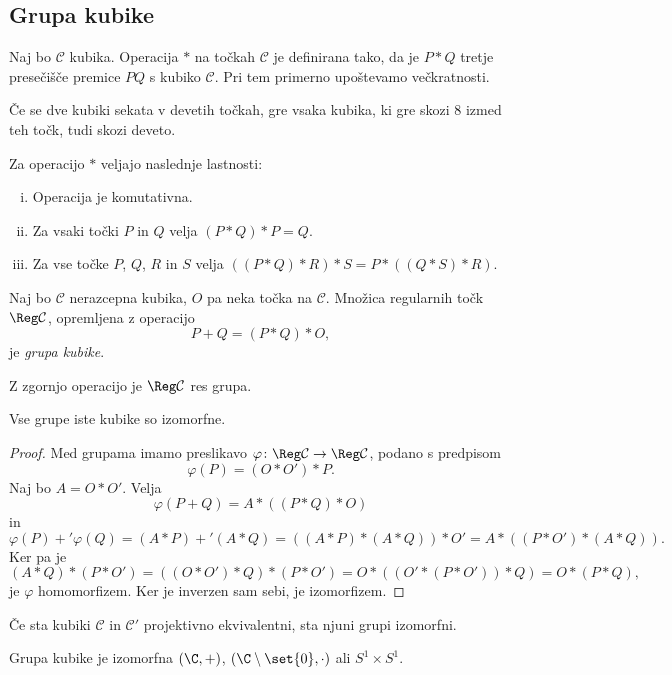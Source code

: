 \newpage

\subsection{Grupa kubike}


\begin{definicija}
Naj bo $\mathcal{C}$ kubika. Operacija $*$ na točkah $\mathcal{C}$
je definirana tako, da je $P * Q$ tretje presečišče premice $PQ$ s
kubiko $\mathcal{C}$. Pri tem primerno upoštevamo večkratnosti.
\end{definicija}

\begin{izrek}
Če se dve kubiki sekata v devetih točkah, gre vsaka kubika, ki gre
skozi 8 izmed teh točk, tudi skozi deveto.
\end{izrek}

\begin{trditev}
Za operacijo $*$ veljajo naslednje lastnosti:

\begin{enumerate}[i)]
\item Operacija je komutativna.
\item Za vsaki točki $P$ in $Q$ velja $(P * Q) * P = Q$.
\item Za vse točke $P$, $Q$, $R$ in $S$ velja
$((P * Q) * R) * S = P * ((Q * S) * R)$.
\end{enumerate}
\end{trditev}

\begin{definicija}
Naj bo $\mathcal{C}$ nerazcepna kubika, $O$ pa neka točka na
$\mathcal{C}$. Množica regularnih točk $\Reg \mathcal{C}$,
opremljena z operacijo
\[
P + Q = (P * Q) * O,
\]
je \emph{grupa kubike}.
\end{definicija}

\begin{trditev}
Z zgornjo operacijo je $\Reg \mathcal{C}$ res grupa.
\end{trditev}

\obvs

\begin{trditev}
Vse grupe iste kubike so izomorfne.
\end{trditev}

\begin{proof}
Med grupama imamo preslikavo
$\varphi \colon \Reg \mathcal{C} \to \Reg \mathcal{C}$, podano s
predpisom
\[
\varphi(P) = (O * O') * P.
\]
Naj bo $A = O * O'$. Velja
\[
\varphi(P + Q) = A * ((P * Q) * O)
\]
in
\[
\varphi(P) +' \varphi(Q) = (A * P) +' (A * Q) =
((A * P) * (A * Q)) * O' =
A * ((P * O') * (A * Q)).
\]
Ker pa je
\[
(A * Q) * (P * O') =
((O * O') * Q) * (P * O') =
O * ((O' * (P * O')) * Q) =
O * (P * Q),
\]
je $\varphi$ homomorfizem. Ker je inverzen sam sebi, je
izomorfizem.
\end{proof}

\begin{trditev}
Če sta kubiki $\mathcal{C}$ in $\mathcal{C}'$ projektivno
ekvivalentni, sta njuni grupi izomorfni.
\end{trditev}

\begin{trditev}
Grupa kubike je izomorfna $(\C, +)$,
$(\C \setminus \set{0}, \cdot)$ ali $S^1 \times S^1$.
\end{trditev}
